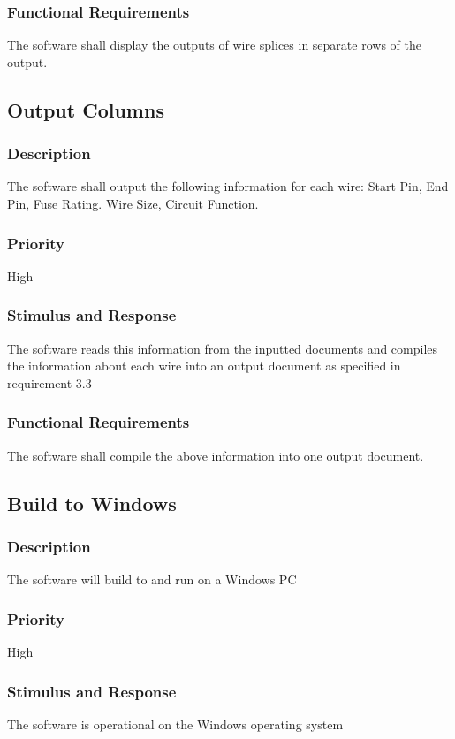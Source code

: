 \subsubsection{Functional Requirements}
 The software shall display the outputs of wire splices in separate rows of the output.
 
  \subsection{Output Columns}
\subsubsection{Description}
The software shall output the following information for each wire:
Start Pin, End Pin, Fuse Rating. Wire Size, Circuit Function.
\subsubsection{Priority}
High

\subsubsection{Stimulus and Response}
The software reads this information from the inputted documents and compiles the information about each wire into an output document  as specified in requirement 3.3

\subsubsection{Functional Requirements}
 The software shall compile the above information into one output document.
 
\subsection{Build to Windows}
\subsubsection{Description}
 The software will build to and run on a Windows PC
\subsubsection{Priority}
High
\subsubsection{Stimulus and Response}
The software is operational on the Windows operating system
